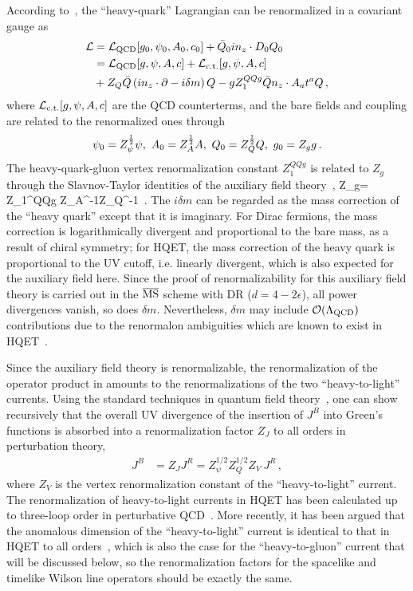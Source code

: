 According to~\cite{Dorn:1986dt}, the ``heavy-quark'' Lagrangian can be renormalized in a covariant gauge as
\begin{align}\label{eq:auxl}
	{\cal L} &= {\cal L}_{\rm QCD}[g_0,\psi_0,A_0,c_0] + \bar{Q}_0in_z\cdot D_0 Q_0\nonumber\\
	&={\cal L}_{\rm QCD}[g,\psi,A,c] +  {\cal L}_{\rm c.t.}[g,\psi,A,c] \nonumber\\
	& +  Z_Q\bar{Q}\left(in_z\cdot \partial - i\delta m\right) Q - g Z_{1}^{QQg}\bar{Q}n_z\cdot A_at^aQ\,,
\end{align}
where ${\cal L}_{\rm c.t.}[g,\psi,A,c]$ are the QCD counterterms, and the bare fields and coupling are related to the renormalized ones through
\begin{align}
	\psi_0=Z_\psi^{1\over2}\psi, \ A_0 = Z_A^{1\over2} A,\ Q_0 = Z_Q^{1\over2} Q,\ g_0=Z_gg\,.
\end{align}
The heavy-quark-gluon vertex renormalization constant $Z_1^{QQg}$ is related to $Z_g$ through the Slavnov-Taylor identities of the auxiliary field theory~\cite{Dorn:1986dt},
\beq
Z_g= Z_1^{QQg} Z_A^{-{1}}Z_Q^{-1}	\,.
\eeq
The $i\delta m$ can be regarded as the mass correction of the ``heavy quark'' except that it is imaginary.
For Dirac fermions, the mass correction is logarithmically divergent and proportional to the bare mass, as a result of chiral symmetry; for HQET, the mass correction of the heavy quark is proportional to the UV cutoff, i.e. linearly divergent, which is also expected for the auxiliary field here. Since the proof of renormalizability for this auxiliary field theory is carried out in the ${\overline{\rm MS}}$ scheme with DR ($d=4-2\epsilon$), all power divergences vanish, so does $\delta m$.
Nevertheless, $\delta m$ may include ${\cal O}(\Lambda_{\text{QCD}})$ contributions due to the renormalon ambiguities which are known to exist in HQET~\cite{Bigi:1994em,Beneke:1994sw}.

Since the auxiliary field theory is renormalizable, the renormalization of the operator product in  amounts to the renormalizations of the two ``heavy-to-light'' currents. Using the standard techniques in quantum field theory~\cite{Collins:1984xc}, one can show recursively that the overall UV divergence of the insertion of $J^B$ into Green's functions is absorbed into a renormalization factor $Z_J$ to all orders in perturbation theory,
\begin{align}
	J^B&=Z_{J}J^R = Z_{\psi}^{1/2}Z_{Q}^{1/2}Z_{V}\ J^R\,,
\end{align}
where $Z_{V}$ is the vertex renormalization constant of the ``heavy-to-light'' current.
The renormalization of heavy-to-light currents in HQET has been calculated up to three-loop order in perturbative QCD~\cite{Shifman:1986sm,Politzer:1988wp,Ji:1991pr,Chetyrkin:2003vi,Broadhurst:1991fz}. More recently, it has been argued that the anomalous dimension of the ``heavy-to-light'' current is identical to that in HQET to all orders~\cite{Braun:2020ymy}, which is also the case for the ``heavy-to-gluon'' current that will be discussed below, so the renormalization factors for the spacelike and timelike Wilson line operators should be exactly the same.


